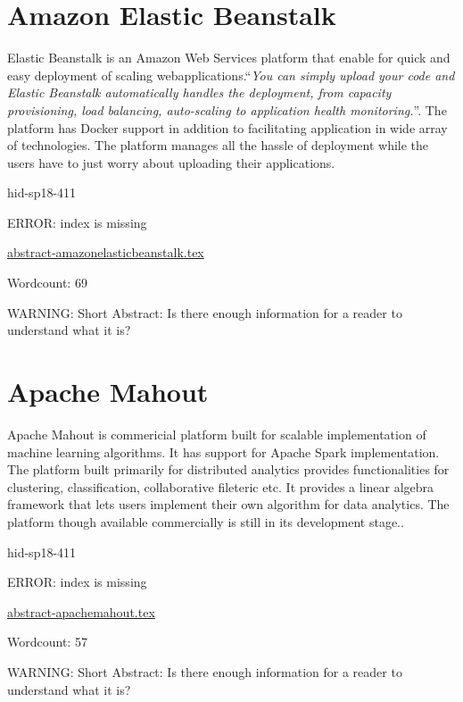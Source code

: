 \section{Amazon Elastic Beanstalk}
Elastic Beanstalk is an Amazon Web Services platform that enable for quick
and easy deployment of scaling webapplications.\color{blue}``\emph{You can simply upload your
code and Elastic Beanstalk automatically handles the deployment, from
capacity provisioning, load balancing, auto-scaling to application health
monitoring.}''\color{black}\cite{hid-sp18-411-amazonelasticbeanstalk}. The platform has
Docker support in addition to facilitating application in wide array of
technologies. The platform manages all the hassle of deployment while the
users have to just worry about uploading their applications.


\begin{IU}

hid-sp18-411

ERROR: index is missing

\href{https://github.com/cloudmesh-community/hid-sp18-411/blob/master//technology/abstract-amazonelasticbeanstalk.tex}{abstract-amazonelasticbeanstalk.tex}

 

Wordcount: 69

WARNING: Short Abstract: Is there enough information for a reader to understand what it is?

\end{IU}

\section{Apache Mahout}
Apache Mahout is commericial platform built for scalable implementation of
machine learning algorithms. It has support for Apache Spark implementation.
The platform built primarily for distributed analytics provides
functionalities for clustering, classification, collaborative fileteric etc.
It provides a linear algebra framework that lets users implement their own
algorithm for data analytics. The platform though available commercially is
still in its development stage.\cite{hid-sp18-411-apachemahout}.

\begin{IU}

hid-sp18-411

ERROR: index is missing

\href{https://github.com/cloudmesh-community/hid-sp18-411/blob/master//technology/abstract-apachemahout.tex}{abstract-apachemahout.tex}

 

Wordcount: 57

WARNING: Short Abstract: Is there enough information for a reader to understand what it is?

\end{IU}

